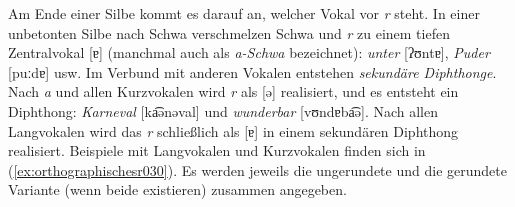 Am Ende einer Silbe kommt es darauf an, welcher Vokal vor \textit{r} steht.
In einer unbetonten Silbe nach Schwa verschmelzen Schwa und \textit{r} zu einem tiefen Zentralvokal [ɐ] (manchmal auch als \textit{a-Schwa} bezeichnet): \textit{unter} [ʔʊntɐ], \textit{Puder} [puːdɐ] usw.
Im Verbund mit anderen Vokalen entstehen \textit{sekundäre Diphthonge}.
Nach \textit{a} und allen Kurzvokalen wird \textit{r} als [ə] realisiert, und es entsteht ein Diphthong: \textit{Karneval} [ka͡ənəval] und \textit{wunderbar} [vʊndɐba͡ə].
Nach allen Langvokalen wird das \textit{r} schließlich als [ɐ] in einem sekundären Diphthong realisiert.
Beispiele mit Langvokalen und Kurzvokalen finden sich in (\ref{ex:orthographischesr030}).
Es werden jeweils die ungerundete und die gerundete Variante (wenn beide existieren) zusammen angegeben.

\begin{exe}
  \ex\label{ex:orthographischesr030}
  \begin{xlist}
  \end{xlist}
\end{exe}

